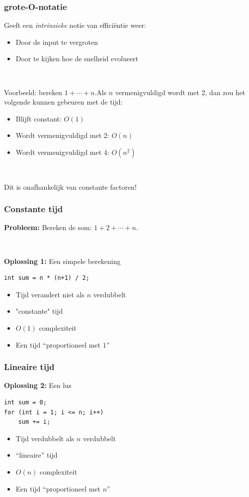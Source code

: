 \documentclass[12pt]{beamer}
\begin{document}
\begin{frame}
\frametitle{grote-O-notatie}
Geeft een \emph{intrinsieke} notie van efficiëntie weer:
\begin{itemize}
\item Door de input te vergroten
\item Door te kijken hoe de snelheid evolueert
\end{itemize}

~

Voorbeeld: bereken $1+\cdots+n$.Als $n$ vermenigvuldigd wordt met 2, dan zou het volgende kunnen gebeuren met de tijd:
\begin{itemize}
\item Blijft constant: $O(1)$
\item Wordt vermenigvuldigd met 2: $O(n)$
\item Wordt vermenigvuldigd met 4: $O(n^2)$
\end{itemize}

~

Dit is onafhankelijk van constante factoren!
\end{frame}

\begin{frame}[fragile]
\frametitle{Constante tijd}
\textbf{Probleem:} Bereken de som: $1+2+\cdots+n$.

~

\textbf{Oplossing 1:} Een simpele berekening
\begin{lstlisting}
int sum = n * (n+1) / 2;
\end{lstlisting}
\begin{itemize}
\item Tijd verandert niet als $n$ verdubbelt
\item "constante" tijd
\item  $O(1)$ complexiteit
\item Een tijd ``proportioneel met $1$''
\end{itemize}
\end{frame}

\begin{frame}[fragile]
\frametitle{Lineaire tijd}
\textbf{Oplossing 2:} Een lus
\begin{lstlisting}
int sum = 0;
for (int i = 1; i <= n; i++)
    sum += i;
\end{lstlisting}
\begin{itemize}
\item Tijd verdubbelt als $n$ verdubbelt
\item ``lineaire'' tijd
\item  $O(n)$ complexiteit
\item Een tijd ``proportioneel met $n$''
\end{itemize}
\end{frame}
\end{document}

